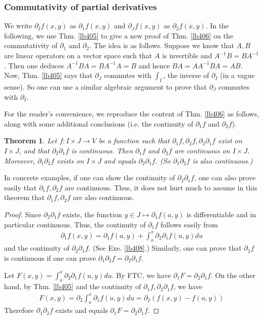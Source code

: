 \documentclass[12pt,b5paper,notitlepage]{article}
\theoremstyle{definition}
\theoremstyle{plain}
\newtheorem{thm}[df]{Theorem}
\newcommand{\dps}{\displaystyle}
\numberwithin{equation}{section}
\begin{document}
\subsubsection{Commutativity of partial derivatives}


We write $\partial_If(x,y)$ as $\partial_1f(x,y)$ and $\partial_Jf(x,y)$ as $\partial_2f(x,y)$. In the following, we use Thm. \ref{lb405} to give a new proof of Thm. \ref{lb406} on the commutativity of $\partial_1$ and $\partial_2$. The idea is as follows. Suppose we know that $A,B$ are linear operators on a vector space such that $A$ is invertible and $A^{-1}B=BA^{-1}$. Then one deduces $A^{-1}BA=BA^{-1}A=B$ and hence $BA=AA^{-1}BA=AB$. Now, Thm. \ref{lb405} says that $\partial_J$  commutes with $\int_I$, the inverse of $\partial_I$ (in a vague sense). So one can use a similar algebraic argument to prove that $\partial_J$ commutes with $\partial_I$.

For the reader's convenience, we reproduce the content of Thm. \ref{lb406} as follows, along with some additional conclusions (i.e. the continuity of $\partial_1f$ and $\partial_2f$).


\begin{thm}\label{lb407}
Let $f:I\times J\rightarrow V$ be a function such that $\partial_1f,\partial_2f,\partial_2\partial_1f$ exist on $I\times J$, and that $\partial_2\partial_1f$ is continuous. Then $\partial_1f$ and $\partial_2f$ are continuous on $I\times J$. Moreover, $\partial_1\partial_2f$ exists on $I\times J$ and equals $\partial_2\partial_1f$. (So $\partial_1\partial_2f$ is also continuous.)
\end{thm}


In concrete examples, if one can show the continuity of $\partial_2\partial_1f$, one can also prove easily that $\partial_1f,\partial_2f$ are continuous. Thus, it does not hurt much to assume in this theorem that $\partial_1f,\partial_2f$ are also continuous.


\begin{proof}
Since $\partial_2\partial_1f$ exists, the function $y\in J\mapsto\partial_1f(a,y)$ is differentiable and in particular continuous. Thus, the continuity of $\partial_1f$ follows easily from
\begin{align*}
\partial_1f(x,y)=\partial_1f(a,y)+\int_a^x\partial_2\partial_1f(u,y)du
\end{align*}
and the continuity of $\partial_2\partial_1f$. (See Exe. \ref{lb408}.) Similarly, one can prove that $\partial_2f$ is continuous if one can prove $\partial_1\partial_2f=\partial_2\partial_1f$. 

Let $\dps F(x,y)=\int_a^x\partial_2\partial_1 f(u,y)du$. By FTC, we have $\partial_1F=\partial_2\partial_1f$. On the other hand, by Thm. \ref{lb405} and the continuity of $\partial_1f,\partial_2\partial_1f$, we have
\begin{align*}
F(x,y)=\partial_2\int_a^x\partial_1f(u,y)du=\partial_2(f(x,y)-f(a,y))
\end{align*}
Therefore $\partial_1\partial_2f$ exists and equals $\partial_1F=\partial_2\partial_1f$.
\end{proof}
\end{document}
